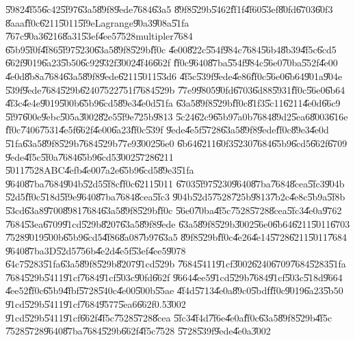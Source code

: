 \documentclass[12pt,a4paper]{article}
\begin{document}
\U{5982}\U{4f55}\U{6c42}\U{5f97}\U{63a5}\U{89f8}\U{9ede}\U{7684}\U{63a5}%
\U{89f8}\U{529b}\U{5462}\U{ff1f}\U{4f60}\U{53ef}\U{80fd}\U{6703}\U{60f3}%
\U{8aaa}\U{ff0c}\U{6211}\U{5011}\U{5f9e}Lagrange\U{90a3}\U{908a}\U{51fa}%
\U{767c}\U{90a3}\U{6216}\U{8a31}\U{53ef}\U{4ee5}\U{7528}multipler\U{7684}%
\U{65b9}\U{5f0f}\U{4f86}\U{5f97}\U{5230}\U{63a5}\U{89f8}\U{529b}\U{ff0c}%
\U{4e00}\U{822c}\U{554f}\U{984c}\U{7684}\U{56b4}\U{8b39}\U{4f5c}\U{6cd5}%
\U{662f}\U{9019}\U{6a23}\U{5b50}\U{6c92}\U{932f}\U{3002}\U{4f46}\U{662f}%
\U{ff0c}\U{9640}\U{87ba}\U{554f}\U{984c}\U{56e0}\U{70ba}\U{552f}\U{4e00}%
\U{4e0d}\U{8b8a}\U{7684}\U{63a5}\U{89f8}\U{9ede}\U{6211}\U{5011}\U{53d6}%
\U{4f5c}\U{539f}\U{9ede}\U{4e86}\U{ff0c}\U{56e0}\U{6b64}\U{901a}\U{904e}%
\U{539f}\U{9ede}\U{7684}\U{529b}\U{6240}\U{7522}\U{751f}\U{7684}\U{529b}%
\U{77e9}\U{9805}\U{90fd}\U{6703}\U{6d88}\U{5931}\U{ff0c}\U{56e0}\U{6b64}%
\U{4f3c}\U{4e4e}\U{9019}\U{500b}\U{65b9}\U{6cd5}\U{89e3}\U{4e0d}\U{51fa}%
\U{63a5}\U{89f8}\U{529b}\U{ff0c}\U{81f3}\U{5c11}\U{6211}\U{4e0d}\U{66c9}%
\U{5f97}\U{600e}\U{9ebc}\U{505a}\U{3002}\U{82e5}\U{5f9e}\U{725b}\U{9813}%
\U{5c24}\U{62c9}\U{65b9}\U{7a0b}\U{7684}\U{89d2}\U{5ea6}\U{8003}\U{616e}%
\U{ff0c}\U{7406}\U{7531}\U{4e5f}\U{662f}\U{4e00}\U{6a23}\U{ff0c}\U{539f}%
\U{9ede}\U{4e5f}\U{5728}\U{63a5}\U{89f8}\U{9ede}\U{ff0c}\U{89e3}\U{4e0d}%
\U{51fa}\U{63a5}\U{89f8}\U{529b}\U{7684}\U{529b}\U{77e9}\U{3002}\U{56e0}%
\U{6b64}\U{6211}\U{60f3}\U{5230}\U{7684}\U{65b9}\U{6cd5}\U{662f}\U{6709}%
\U{9ede}\U{4f5c}\U{5f0a}\U{7684}\U{65b9}\U{6cd5}\U{3002}\U{5728}\U{6211}%
\U{5011}\U{7528}ABC\U{4efb}\U{4e00}\U{7a2e}\U{65b9}\U{6cd5}\U{89e3}\U{51fa}%
\U{9640}\U{87ba}\U{7684}\U{904b}\U{52d5}\U{5f8c}\U{ff0c}\U{6211}\U{5011}%
\U{6703}\U{5f97}\U{5230}\U{9640}\U{87ba}\U{7684}\U{8cea}\U{5fc3}\U{904b}%
\U{52d5}\U{ff0c}\U{518d}\U{5f9e}\U{9640}\U{87ba}\U{7684}\U{8cea}\U{5fc3}%
\U{904b}\U{52d5}\U{7528}\U{725b}\U{9813}\U{7b2c}\U{4e8c}\U{5b9a}\U{5f8b}%
\U{53cd}\U{63a8}\U{9700}\U{8981}\U{7684}\U{63a5}\U{89f8}\U{529b}\U{ff0c}%
\U{56e0}\U{70ba}\U{4f5c}\U{7528}\U{5728}\U{8cea}\U{5fc3}\U{4e0a}\U{9762}%
\U{7684}\U{53ea}\U{6709}\U{91cd}\U{529b}\U{8207}\U{63a5}\U{89f8}\U{9ede}%
\U{63a5}\U{89f8}\U{529b}\U{3002}\U{56e0}\U{6b64}\U{6211}\U{5011}\U{6703}%
\U{7528}\U{9019}\U{500b}\U{65b9}\U{6cd5}\U{4f86}\U{8a08}\U{7b97}\U{63a5}%
\U{89f8}\U{529b}\U{ff0c}\U{4e26}\U{4e14}\U{5728}\U{6211}\U{5011}\U{7684}%
\U{9640}\U{87ba}3D\U{52d5}\U{756b}\U{4e2d}\U{4e5f}\U{53ef}\U{4ee5}\U{9078}%
\U{64c7}\U{5283}\U{51fa}\U{63a5}\U{89f8}\U{529b}\U{8207}\U{91cd}\U{529b}%
\U{7684}\U{5411}\U{91cf}\U{3002}\U{6240}\U{6709}\U{7684}\U{5283}\U{51fa}%
\U{7684}\U{529b}\U{5411}\U{91cf}\U{7684}\U{91cf}\U{503c}\U{90fd}\U{662f}%
\U{9664}\U{4ee5}\U{91cd}\U{529b}\U{7684}\U{91cf}\U{503c}\U{518d}\U{9664}%
\U{4ee5}2\U{ff0c}\U{65b9}\U{4fbf}\U{5728}\U{540c}\U{4e00}\U{500b}\U{55ae}%
\U{4f4d}\U{5713}\U{4e0a}\U{89c0}\U{5bdf}\U{ff0c}\U{9019}\U{6a23}\U{5b50}%
\U{91cd}\U{529b}\U{5411}\U{91cf}\U{7684}\U{9577}\U{5ea6}\U{662f}0.5\U{3002}%
\U{91cd}\U{529b}\U{5411}\U{91cf}\U{662f}\U{4f5c}\U{7528}\U{5728}\U{8cea}%
\U{5fc3}\U{4f4d}\U{7f6e}\U{4e0a}\U{ff0c}\U{63a5}\U{89f8}\U{529b}\U{4f5c}%
\U{7528}\U{5728}\U{9640}\U{87ba}\U{7684}\U{529b}\U{662f}\U{4f5c}\U{7528}%
\U{5728}\U{539f}\U{9ede}\U{4e0a}\U{3002}
\end{document}
